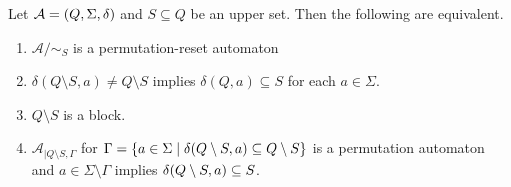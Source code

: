 \begin{proposition} \label{prelim:perm-reset-Rees-factor}
Let $\mathcal A = (Q, \Sigma, \delta)$ and $S \subseteq Q$ be an upper set.
	Then the following are equivalent.
\begin{enumerate}
\item \label{prelim:perm-reset-Rees-factor:1} $\mathcal A / {\sim_S}$ is a permutation-reset automaton 

\item \label{prelim:perm-reset-Rees-factor:2} $
\delta(Q \setminus S, a) \ne Q \setminus S
$
implies
$ 
\delta(Q, a) \subseteq S
$
for each $a \in \Sigma$.

\item \label{prelim:perm-reset-Rees-factor:3} $Q \setminus S$ is a block.
	
\item \label{prelim:perm-reset-Rees-factor:4} $\mathcal A_{|Q\setminus S, \Gamma}$ for $\Gamma = \{ a \in \Sigma \mid \delta(Q \setminus S,a) \subseteq Q \setminus S\}$ is a permutation automaton and $a \in \Sigma\setminus \Gamma$ implies $\delta(Q \setminus S,a) \subseteq S$.
\end{enumerate}
\end{proposition}
